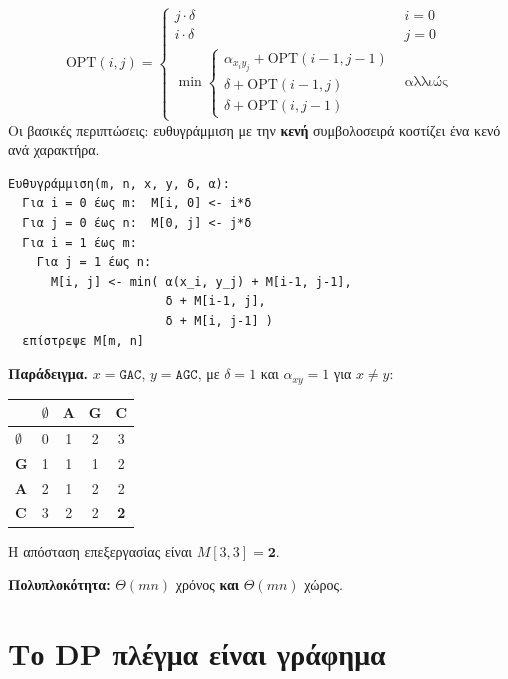 \documentclass[11pt,a4paper]{article}
\begin{document}
\begin{keypoint}
\[
\text{OPT}(i, j) =
\begin{cases}
j \cdot \delta & i = 0 \\[3pt]
i \cdot \delta & j = 0 \\[3pt]
\min \begin{cases}
\alpha_{x_i y_j} + \text{OPT}(i-1, j-1) \\
\delta + \text{OPT}(i-1, j) \\
\delta + \text{OPT}(i, j-1)
\end{cases} & \text{αλλιώς}
\end{cases}
\]
Οι βασικές περιπτώσεις: ευθυγράμμιση με την \textbf{κενή} συμβολοσειρά κοστίζει
ένα κενό ανά χαρακτήρα.
\end{keypoint}

\begin{codebox}
\begin{verbatim}
Ευθυγράμμιση(m, n, x, y, δ, α):
  Για i = 0 έως m:  M[i, 0] <- i*δ
  Για j = 0 έως n:  M[0, j] <- j*δ
  Για i = 1 έως m:
    Για j = 1 έως n:
      M[i, j] <- min( α(x_i, y_j) + M[i-1, j-1],
                      δ + M[i-1, j],
                      δ + M[i, j-1] )
  επίστρεψε M[m, n]
\end{verbatim}
\end{codebox}

\textbf{Παράδειγμα.} $x = \texttt{GAC}$, $y = \texttt{AGC}$, με $\delta = 1$ και
$\alpha_{xy} = 1$ για $x \ne y$:

\begin{center}
\begin{tabular}{@{}l *{4}{c}@{}}
\toprule
 & $\emptyset$ & A & G & C \\
\midrule
\textbf{$\emptyset$} & 0 & 1 & 2 & 3 \\
\textbf{G}           & 1 & 1 & 1 & 2 \\
\textbf{A}           & 2 & 1 & 2 & 2 \\
\textbf{C}           & 3 & 2 & 2 & \textbf{2} \\
\bottomrule
\end{tabular}
\end{center}

Η απόσταση επεξεργασίας είναι $M[3, 3] = \mathbf{2}$.

\textbf{Πολυπλοκότητα:} $\Theta(mn)$ χρόνος \textbf{και} $\Theta(mn)$ χώρος.

\section{Το DP πλέγμα είναι γράφημα}
\end{document}
